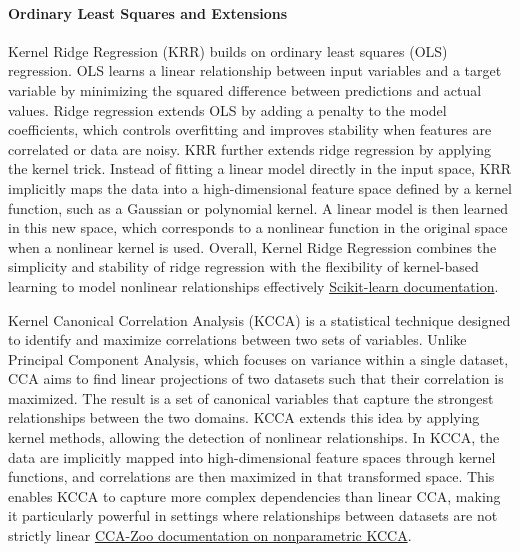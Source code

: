 \paragraph{Ordinary Least Squares and Extensions}
\label{sec:background_ml_lr}
Kernel Ridge Regression (KRR) builds on ordinary least squares (OLS) regression. OLS learns a linear relationship between input variables and a target variable by minimizing the squared difference between predictions and actual values. Ridge regression extends OLS by adding a penalty to the model coefficients, which controls overfitting and improves stability when features are correlated or data are noisy.
KRR further extends ridge regression by applying the kernel trick. Instead of fitting a linear model directly in the input space, KRR implicitly maps the data into a high-dimensional feature space defined by a kernel function, such as a Gaussian or polynomial kernel. A linear model is then learned in this new space, which corresponds to a nonlinear function in the original space when a nonlinear kernel is used.
Overall, Kernel Ridge Regression combines the simplicity and stability of ridge regression with the flexibility of kernel-based learning to model nonlinear relationships effectively \href{https://scikit-learn.org/stable/modules/linear_model.html}{Scikit-learn documentation}.

\label{sec:background_ml_kcca}
Kernel Canonical Correlation Analysis (KCCA) is a statistical technique designed to identify and maximize correlations between two sets of variables. Unlike Principal Component Analysis, which focuses on variance within a single dataset, CCA aims to find linear projections of two datasets such that their correlation is maximized. The result is a set of canonical variables that capture the strongest relationships between the two domains. KCCA extends this idea by applying kernel methods, allowing the detection of nonlinear relationships. In KCCA, the data are implicitly mapped into high-dimensional feature spaces through kernel functions, and correlations are then maximized in that transformed space. This enables KCCA to capture more complex dependencies than linear CCA, making it particularly powerful in settings where relationships between datasets are not strictly linear \cite{1202783} \cite{5644899} \href{https://cca-zoo.readthedocs.io/en/stable/modules/generated/cca_zoo.nonparametric.KCCA.html#cca_zoo.nonparametric.KCCA}{CCA-Zoo documentation on nonparametric KCCA}.

